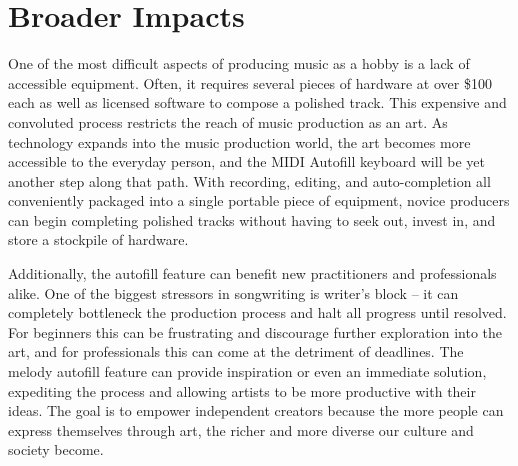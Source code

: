 \section{Broader Impacts}

One of the most difficult aspects of producing music as a hobby is a lack of
accessible equipment. Often, it requires several pieces of hardware at over \$100
each as well as licensed software to compose a polished track. This expensive
and convoluted process restricts the reach of music production as an art. As
technology expands into the music production world, the art becomes more
accessible to the everyday person, and the MIDI Autofill keyboard will be yet
another step along that path. With recording, editing, and auto-completion all
conveniently packaged into a single portable piece of equipment, novice
producers can begin completing polished tracks without having to seek out,
invest in, and store a stockpile of hardware.

Additionally, the autofill feature can benefit new practitioners and
professionals alike. One of the biggest stressors in songwriting is writer’s
block – it can completely bottleneck the production process and halt all
progress until resolved. For beginners this can be frustrating and discourage
further exploration into the art, and for professionals this can come at the
detriment of deadlines. The melody autofill feature can provide inspiration or
even an immediate solution, expediting the process and allowing artists to be
more productive with their ideas. The goal is to empower independent creators
because the more people can express themselves through art, the richer and more
diverse our culture and society become.
